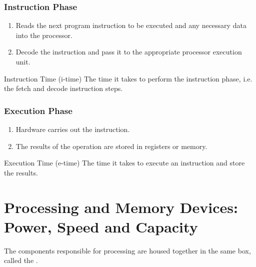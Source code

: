 \documentclass[\main/notes.tex]{subfiles}
\begin{document}
				\subsubsection{Instruction Phase}
					\begin{enumerate}
						\item {} Reads the next program instruction to be executed and any necessary data into the processor.
						\item {} Decode the instruction and pass it to the appropriate processor execution unit.
					\end{enumerate}
					\begin{definition}{Instruction Time (i-time)}
					The time it takes to perform the instruction phase, i.e. the fetch and decode instruction steps.
					\end{definition}
				\subsubsection{Execution Phase}
					\begin{enumerate}[resume]
						\item {} Hardware carries out the instruction.
						\item {} The results of the operation are stored in registers or memory.
					\end{enumerate}
					\begin{definition}{Execution Time (e-time)}
						The time it takes to execute an instruction and store the results.
					\end{definition}

		\section[Processing and Memory Devices]{Processing and Memory Devices: Power, Speed and Capacity}
			The components responsible for processing are housed together in the same box, called the .
\end{document}
